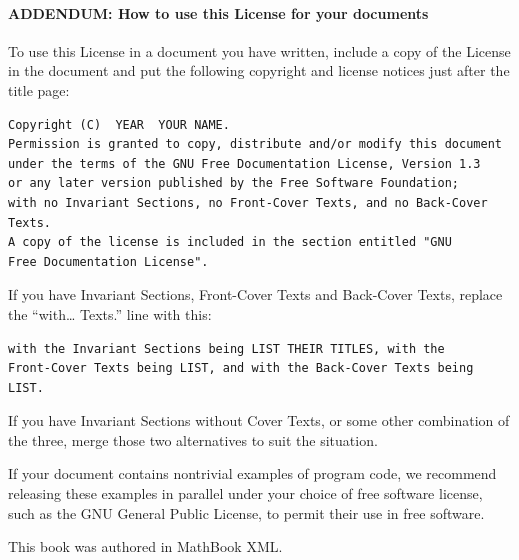 \documentclass[10pt,]{book}
\theoremstyle{plain}
\theoremstyle{definition}
\theoremstyle{definition}
\numberwithin{equation}{section}
\begin{document}
\paragraph[{ADDENDUM: How to use this License for your documents}]{ADDENDUM: How to use this License for your documents}\hypertarget{gfdl-addendum}{}
To use this License in a document you have written, include a copy of the License in the document and put the following copyright and license notices just after the title page:%
\begin{verbatim}
Copyright (C)  YEAR  YOUR NAME.
Permission is granted to copy, distribute and/or modify this document
under the terms of the GNU Free Documentation License, Version 1.3
or any later version published by the Free Software Foundation;
with no Invariant Sections, no Front-Cover Texts, and no Back-Cover Texts.
A copy of the license is included in the section entitled "GNU
Free Documentation License".
\end{verbatim}
\par
If you have Invariant Sections, Front-Cover Texts and Back-Cover Texts, replace the ``with\dots{} Texts.'' line with this:%
\begin{verbatim}
with the Invariant Sections being LIST THEIR TITLES, with the
Front-Cover Texts being LIST, and with the Back-Cover Texts being LIST.
\end{verbatim}
\par
If you have Invariant Sections without Cover Texts, or some other combination of the three, merge those two alternatives to suit the situation.%
\par
If your document contains nontrivial examples of program code, we recommend releasing these examples in parallel under your choice of free software license, such as the GNU General Public License, to permit their use in free software.%
%
\backmatter
%
%
\printindex
%
\cleardoublepage
\pagestyle{empty}
\centerline{This book was authored in MathBook XML.%
}
\end{document}
